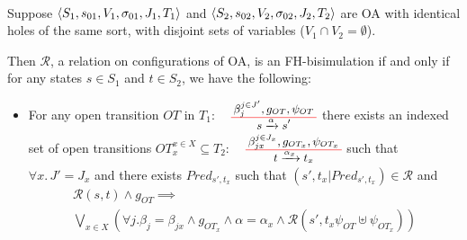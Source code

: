 \documentclass[runningheads]{llncs}
\begin{document}
 \begin{definition}\label{def-FH-bisim} ~\\
\noindent
	Suppose  $\OAg[1]$ and $\OAg[2]$
   are OA with identical holes of the same sort, with disjoint sets of variables ($V_1\cap V_2=\emptyset$).  

 Then 
$\mathcal{R}$, a relation on configurations of OA, is an FH-bisimulation if and only if for any  states
$s\in{S}_1$ and $t\in{S}_2$, we 
have
the following:

 \begin{itemize}
 \item   
For any open transition $OT$ in ${T}_1$:
$
     \OTbase{s \xrightarrow{\alpha} s'}
         {
           \beta_j^{j\in J'}}{g_{OT}}{\psi_{OT}}
$
 there exists an indexed set of  open transitions $OT_x^{x\in X} \subseteq {T}_2$:
$
    \OTbase{t \xrightarrow{\alpha_x} t_x}
         {
           \beta_{j x}^{j\in J_{x}}}{ g_{OT_x}}{\psi_{OT_x}}   
$
 such that  $\forall x.\, J'=J_{x}$ and there exists $Pred_{s',t_x}$ such that $(s',t_x|Pred_{s',t_x})\in 
 \mathcal{R}$
 and  
\begin{multline*}
 \mathcal{R}(s,t) \land g_{OT}\implies\\
 \displaystyle{\bigvee_{x\in X}
   \left( \forall j. \beta_j=\beta_{jx}  \land g_{OT_x}
     \land \alpha\!=\!\alpha_x \land  
     \mathcal{R}\left(s',t_x{\psi_{OT}\!\uplus\!\psi_{OT_x}}\right)\right)}
\end{multline*}
%




\end{itemize}
\end{definition}
\end{document}
